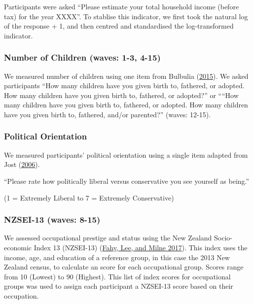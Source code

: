 \documentclass[
  singlecolumn]{report}
\begin{document}
Participants were asked ``Please estimate your total household income
(before tax) for the year XXXX''. To stablise this indicator, we first
took the natural log of the response + 1, and then centred and
standardised the log-transformed indicator.

\hypertarget{number-of-children-waves-1-3-4-15}{%
\subsubsection{Number of Children (waves: 1-3,
4-15)}\label{number-of-children-waves-1-3-4-15}}

We measured number of children using one item from Bulbulia
(\protect\hyperlink{ref-Bulbulia_2015}{2015}). We asked participants
``How many children have you given birth to, fathered, or adopted. How
many children have you given birth to, fathered, or adopted?'' or
````How many children have you given birth to, fathered, or adopted. How
many children have you given birth to, fathered, and/or parented?''
(waves: 12-15).

\hypertarget{political-orientation}{%
\subsubsection{Political Orientation}\label{political-orientation}}

We measured participants' political orientation using a single item
adapted from Jost (\protect\hyperlink{ref-jost_end_2006-1}{2006}).

``Please rate how politically liberal versus conservative you see
yourself as being.''

(1 = Extremely Liberal to 7 = Extremely Conservative)

\hypertarget{nzsei-13-waves-8-15}{%
\subsubsection{NZSEI-13 (waves: 8-15)}\label{nzsei-13-waves-8-15}}

We assessed occupational prestige and status using the New Zealand
Socio-economic Index 13 (NZSEI-13)
(\protect\hyperlink{ref-fahy2017}{Fahy, Lee, and Milne 2017}). This
index uses the income, age, and education of a reference group, in this
case the 2013 New Zealand census, to calculate an score for each
occupational group. Scores range from 10 (Lowest) to 90 (Highest). This
list of index scores for occupational groups was used to assign each
participant a NZSEI-13 score based on their occupation.
\end{document}

